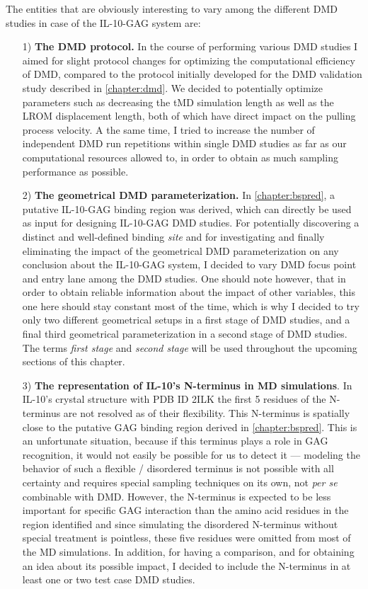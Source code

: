 The entities that are obviously interesting to vary among the different DMD
studies in case of the IL-10-GAG system are:

\begin{itemize}

\item[1)] \textbf{The DMD protocol.} In the course of performing various DMD
studies I aimed for slight protocol changes for optimizing the computational
efficiency of DMD, compared to the protocol initially developed for the DMD
validation study described in \cref{chapter:dmd}. We decided to potentially
optimize parameters such as decreasing the tMD simulation length as well as the
LROM displacement length, both of which have direct impact on the pulling
process velocity. A the same time, I tried to increase the number of
independent DMD run repetitions within single DMD studies as far as our
computational resources allowed to, in order to obtain as much sampling
performance as possible.

\item[2)] \textbf{The geometrical DMD parameterization.} In
\cref{chapter:bspred}, a putative IL-10-GAG binding region was derived, which
can directly be used as input for designing IL-10-GAG DMD studies. For
potentially discovering a distinct and well-defined binding \textit{site} and
for investigating and finally eliminating the impact of the geometrical DMD
parameterization on any conclusion about the IL-10-GAG system, I decided to vary
DMD focus point and entry lane among the DMD studies. One should note however,
that in order to obtain reliable information about the impact of other
variables, this one here should stay constant most of the time, which is why I
decided to try only two different geometrical setups in a first stage of DMD
studies, and a final third geometrical parameterization in a second stage of
DMD studies. The terms \textit{first stage} and \textit{second stage} will be
used throughout the upcoming sections of this chapter.

\item[3)] \textbf{The representation of IL-10's N-terminus in MD simulations}.
In IL-10's crystal structure with PDB ID 2ILK the first 5 residues of the
N-terminus are not resolved as of their flexibility. This N-terminus is
spatially close to the putative GAG binding region derived in
\cref{chapter:bspred}. This is an unfortunate situation, because if this
terminus plays a role in GAG recognition, it would not easily be possible for us
to detect it --- modeling the behavior of such a flexible / disordered terminus
is not possible with all certainty and requires special sampling techniques on
its own, not \textit{per se} combinable with DMD. However, the N-terminus is
expected to be less important for specific GAG interaction than the amino acid
residues in the region identified and since simulating the disordered N-terminus
without special treatment is pointless, these five residues were omitted from
most of the MD simulations. In addition, for having a comparison, and for
obtaining an idea about its possible impact, I decided to include the
N-terminus in at least one or two test case DMD studies.


\end{itemize}
